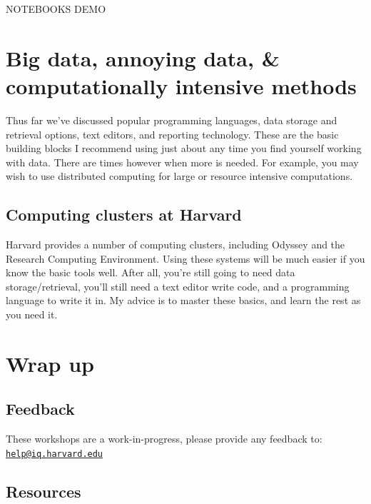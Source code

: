 \documentclass[]{book}
\begin{document}
NOTEBOOKS DEMO

\section{Big data, annoying data, \& computationally intensive
methods}\label{big-data-annoying-data-computationally-intensive-methods}

Thus far we've discussed popular programming languages, data storage and
retrieval options, text editors, and reporting technology. These are the
basic building blocks I recommend using just about any time you find
yourself working with data. There are times however when more is needed.
For example, you may wish to use distributed computing for large or
resource intensive computations.

\subsection{Computing clusters at
Harvard}\label{computing-clusters-at-harvard}

Harvard provides a number of computing clusters, including Odyssey and
the Research Computing Environment. Using these systems will be much
easier if you know the basic tools well. After all, you're still going
to need data storage/retrieval, you'll still need a text editor write
code, and a programming language to write it in. My advice is to master
these basics, and learn the rest as you need it.

\section{Wrap up}\label{wrap-up}

\subsection{Feedback}\label{feedback}

These workshops are a work-in-progress, please provide any feedback to:
\href{mailto:help@iq.harvard.edu}{\nolinkurl{help@iq.harvard.edu}}

\subsection{Resources}\label{resources}
\end{document}
